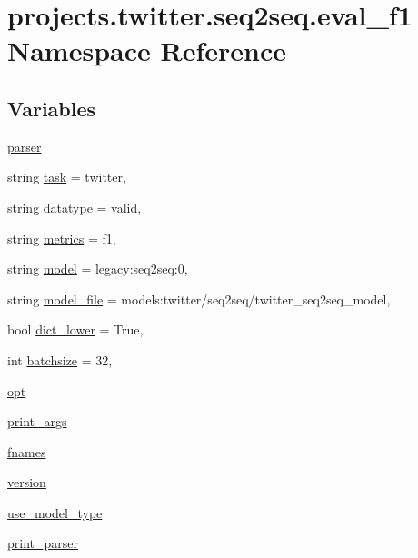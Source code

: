 \hypertarget{namespaceprojects_1_1twitter_1_1seq2seq_1_1eval__f1}{}\section{projects.\+twitter.\+seq2seq.\+eval\+\_\+f1 Namespace Reference}
\label{namespaceprojects_1_1twitter_1_1seq2seq_1_1eval__f1}
\subsection*{Variables}
\begin{DoxyCompactItemize}
\item 
\hyperlink{namespaceprojects_1_1twitter_1_1seq2seq_1_1eval__f1_ad558cbec4682c008ec6e7e47c9f2c86f}{parser}
\item 
string \hyperlink{namespaceprojects_1_1twitter_1_1seq2seq_1_1eval__f1_a0bce02e43668f7eaf7264da87902acfd}{task} = \textquotesingle{}twitter\textquotesingle{},
\item 
string \hyperlink{namespaceprojects_1_1twitter_1_1seq2seq_1_1eval__f1_a26969cb85639525a9e209bf84d52b1ea}{datatype} = \textquotesingle{}valid\textquotesingle{},
\item 
string \hyperlink{namespaceprojects_1_1twitter_1_1seq2seq_1_1eval__f1_abca7ea05a583e818c113e92dc0d3bedd}{metrics} = \textquotesingle{}f1\textquotesingle{},
\item 
string \hyperlink{namespaceprojects_1_1twitter_1_1seq2seq_1_1eval__f1_a69902f8fdd95af89147aff2a7f7e0627}{model} = \textquotesingle{}legacy\+:seq2seq\+:0\textquotesingle{},
\item 
string \hyperlink{namespaceprojects_1_1twitter_1_1seq2seq_1_1eval__f1_af8b64598d4f5c20ff1462d7fb5a0fd8a}{model\+\_\+file} = \textquotesingle{}models\+:twitter/seq2seq/twitter\+\_\+seq2seq\+\_\+model\textquotesingle{},
\item 
bool \hyperlink{namespaceprojects_1_1twitter_1_1seq2seq_1_1eval__f1_aa0bccf689900202cf0e0f75972fa2fc4}{dict\+\_\+lower} = True,
\item 
int \hyperlink{namespaceprojects_1_1twitter_1_1seq2seq_1_1eval__f1_a481451fb9953f790916ee4ad844b000f}{batchsize} = 32,
\item 
\hyperlink{namespaceprojects_1_1twitter_1_1seq2seq_1_1eval__f1_ae2ccb62e5a028bc84095dfcb55b8cfa4}{opt}
\item 
\hyperlink{namespaceprojects_1_1twitter_1_1seq2seq_1_1eval__f1_afeef4b8323b9f23b557386828f33c6c8}{print\+\_\+args}
\item 
\hyperlink{namespaceprojects_1_1twitter_1_1seq2seq_1_1eval__f1_a0cb677281512e90205d9243b0d3dfd04}{fnames}
\item 
\hyperlink{namespaceprojects_1_1twitter_1_1seq2seq_1_1eval__f1_afd98e55a77b1a26d450a72984100a1f1}{version}
\item 
\hyperlink{namespaceprojects_1_1twitter_1_1seq2seq_1_1eval__f1_aa085d0594e97641873a197556a53448c}{use\+\_\+model\+\_\+type}
\item 
\hyperlink{namespaceprojects_1_1twitter_1_1seq2seq_1_1eval__f1_a43266e8d073c7dd7ead285ec769f1443}{print\+\_\+parser}
\end{DoxyCompactItemize}


